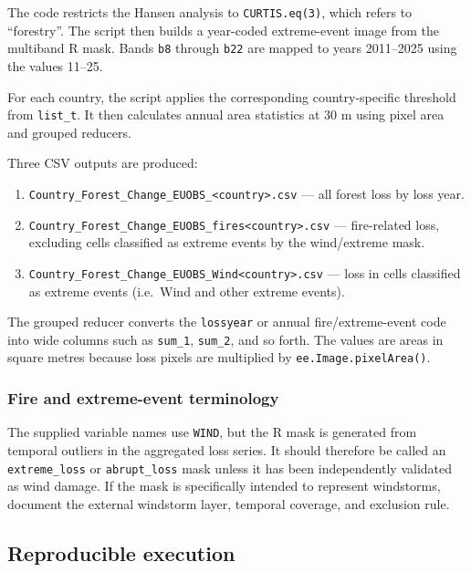 \documentclass[
]{article}
\providecommand{\tightlist}{%
  \setlength{\itemsep}{0pt}\setlength{\parskip}{0pt}}
\begin{document}
The code restricts the Hansen analysis to \texttt{CURTIS.eq(3)}, which
refers to ``forestry''. The script then builds a year-coded
extreme-event image from the multiband R mask. Bands \texttt{b8} through
\texttt{b22} are mapped to years 2011--2025 using the values 11--25.

For each country, the script applies the corresponding country-specific
threshold from \texttt{list\_t}. It then calculates annual area
statistics at 30 m using pixel area and grouped reducers.

Three CSV outputs are produced:

\begin{enumerate}
\def\labelenumi{\arabic{enumi}.}
\tightlist
\item
  \texttt{Country\_Forest\_Change\_EUOBS\_\textless{}country\textgreater{}.csv}
  --- all forest loss by loss year.
\item
  \texttt{Country\_Forest\_Change\_EUOBS\_fires\textless{}country\textgreater{}.csv}
  --- fire-related loss, excluding cells classified as extreme events by
  the wind/extreme mask.
\item
  \texttt{Country\_Forest\_Change\_EUOBS\_Wind\textless{}country\textgreater{}.csv}
  --- loss in cells classified as extreme events (i.e.~Wind and other
  extreme events).
\end{enumerate}

The grouped reducer converts the \texttt{lossyear} or annual
fire/extreme-event code into wide columns such as \texttt{sum\_1},
\texttt{sum\_2}, and so forth. The values are areas in square metres
because loss pixels are multiplied by \texttt{ee.Image.pixelArea()}.

\subsubsection{Fire and extreme-event
terminology}\label{fire-and-extreme-event-terminology}

The supplied variable names use \texttt{WIND}, but the R mask is
generated from temporal outliers in the aggregated loss series. It
should therefore be called an \texttt{extreme\_loss} or
\texttt{abrupt\_loss} mask unless it has been independently validated as
wind damage. If the mask is specifically intended to represent
windstorms, document the external windstorm layer, temporal coverage,
and exclusion rule.

\subsection{Reproducible execution}\label{reproducible-execution}
\end{document}
